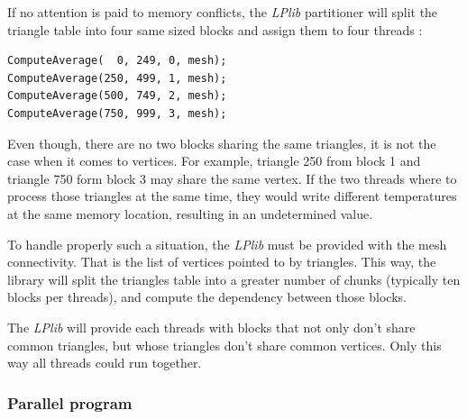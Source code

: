 \documentclass[a4paper,12pt]{article}
\begin{document}
If no attention is paid to memory conflicts, the \emph{LPlib} partitioner will split the triangle table into four same sized blocks and assign them to four threads :

\begin{tt}
\begin{verbatim}
ComputeAverage(  0, 249, 0, mesh);
ComputeAverage(250, 499, 1, mesh);
ComputeAverage(500, 749, 2, mesh);
ComputeAverage(750, 999, 3, mesh);
\end{verbatim}
\end{tt}
\normalfont

Even though, there are no two blocks sharing the same triangles, it is not the case when it comes to vertices. For example, triangle 250 from block 1 and triangle 750 form block 3 may share the same vertex. If the two threads where to process those triangles at the same time, they would write different temperatures at the same memory location, resulting in an undetermined value.

To handle properly such a situation, the \emph{LPlib} must be provided with the mesh connectivity. That is the list of vertices pointed to by triangles. This way, the library will split the triangles table into a greater number of chunks (typically ten blocks per threads), and compute the dependency between those blocks.

The \emph{LPlib} will provide each threads with blocks that not only don't share common triangles, but whose triangles don't share common vertices. Only this way all threads could run together.

\subsubsection{Parallel program}
\end{document}
